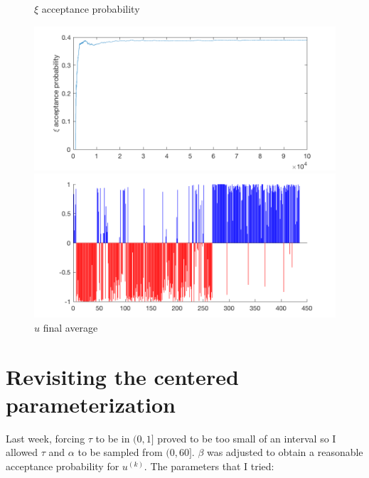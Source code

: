 \documentclass{siamart1116}
\begin{document}
\begin{figure}[!htb]
    \begin{minipage}{0.48\textwidth}
        \centering
        \caption{\label{fig:hier_sim_5} $\xi$ acceptance probability}
        \includegraphics[width=\linewidth]{graphics/noncentered/acceptance_xi_probability.png}
    \end{minipage} \hfill
    \begin{minipage}{0.48\textwidth}
        \centering
        \caption{\label{fig:hier_sim_6} $u$ final average}
        \includegraphics[width=\linewidth]{graphics/noncentered/final_avg.png}
    \end{minipage}
\end{figure}

\section{Revisiting the centered parameterization}
Last week, forcing $\tau$ to be in $(0,1]$ proved to be too small of an interval so I allowed $\tau$ and $\alpha$ to be sampled from $(0, 60]$. $\beta$ was adjusted to obtain a reasonable acceptance probability for $u^{(k)}$. The parameters that I tried:
\end{document}
